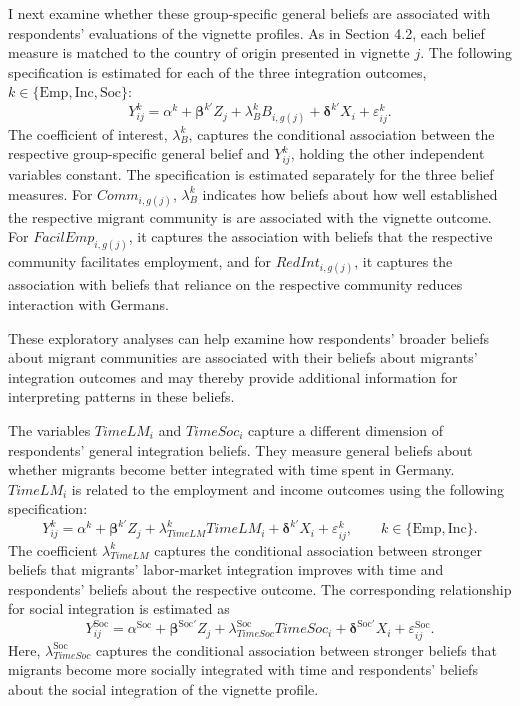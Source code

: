 I next examine whether these group-specific general beliefs are associated with respondents' evaluations of the vignette 
profiles. As in Section 4.2, each belief measure is matched to the country of origin presented in vignette \(j\).
The following specification is estimated for each of the three integration outcomes, 
\(k\in\{\mathrm{Emp},\mathrm{Inc},\mathrm{Soc}\}\):
\begin{equation}
Y_{ij}^{k}
=
\alpha^{k}
+
\boldsymbol{\beta}^{k\prime}Z_j
+
\lambda_{B}^{k}B_{i,g(j)}
+
\boldsymbol{\delta}^{k\prime}X_i
+
\varepsilon_{ij}^{k}.
\end{equation}
The coefficient of interest, \(\lambda_{B}^{k}\), captures the conditional association between the respective 
group-specific general belief and \(Y_{ij}^{k}\), holding the other independent variables constant. The specification 
is estimated separately for the three belief measures. For \(Comm_{i,g(j)}\), \(\lambda_{B}^{k}\) indicates how beliefs
about how well established the respective migrant community is are associated with the vignette outcome. 
For \(FacilEmp_{i,g(j)}\), it captures the association with beliefs that the respective community facilitates employment,
and for \(RedInt_{i,g(j)}\), it captures the association with beliefs that reliance on the respective community reduces 
interaction with Germans.

These exploratory analyses can help examine how respondents' broader beliefs about migrant communities are associated 
with their beliefs about migrants' integration outcomes and may thereby provide additional information for interpreting 
patterns in these beliefs.

The variables \(TimeLM_i\) and \(TimeSoc_i\) capture a different dimension of respondents’ general integration beliefs. 
They measure general beliefs about whether migrants become better integrated with time spent in Germany.
\(TimeLM_i\) is related to the employment and income outcomes using the following specification:
\begin{equation}
Y_{ij}^{k}
=
\alpha^{k}
+
\boldsymbol{\beta}^{k\prime}Z_j
+
\lambda_{TimeLM}^{k}TimeLM_i
+
\boldsymbol{\delta}^{k\prime}X_i
+
\varepsilon_{ij}^{k},
\qquad
k\in\{\mathrm{Emp},\mathrm{Inc}\}.
\end{equation}
The coefficient \(\lambda_{TimeLM}^{k}\) captures the conditional association between stronger beliefs that migrants' 
labor-market integration improves with time and respondents' beliefs about the respective outcome. 
The corresponding relationship for social integration is estimated as
\begin{equation}
Y_{ij}^{\mathrm{Soc}}
=
\alpha^{\mathrm{Soc}}
+
\boldsymbol{\beta}^{\mathrm{Soc}\prime}Z_j
+
\lambda_{TimeSoc}^{\mathrm{Soc}}TimeSoc_i
+
\boldsymbol{\delta}^{\mathrm{Soc}\prime}X_i
+
\varepsilon_{ij}^{\mathrm{Soc}}.
\end{equation}
Here, \(\lambda_{TimeSoc}^{\mathrm{Soc}}\) captures the conditional association between stronger beliefs that migrants become more socially 
integrated with time and respondents' beliefs about the social integration of the vignette profile.

